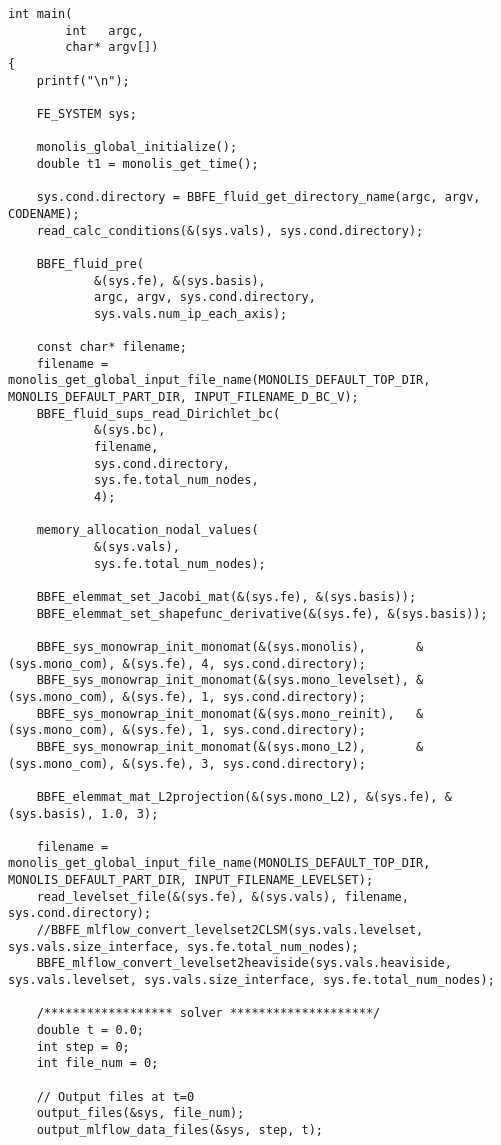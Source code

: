 \begin{lstlisting}[caption = mlflow\_fs.cのmain関数のレベルセット関数の計算部分抜粋]
int main(
		int   argc,
		char* argv[])
{
	printf("\n");

	FE_SYSTEM sys;

	monolis_global_initialize();
	double t1 = monolis_get_time();

	sys.cond.directory = BBFE_fluid_get_directory_name(argc, argv, CODENAME);	
	read_calc_conditions(&(sys.vals), sys.cond.directory);

	BBFE_fluid_pre(
			&(sys.fe), &(sys.basis),
			argc, argv, sys.cond.directory,
			sys.vals.num_ip_each_axis);

	const char* filename;
	filename = monolis_get_global_input_file_name(MONOLIS_DEFAULT_TOP_DIR, MONOLIS_DEFAULT_PART_DIR, INPUT_FILENAME_D_BC_V);
	BBFE_fluid_sups_read_Dirichlet_bc(
			&(sys.bc),
			filename,
			sys.cond.directory,
			sys.fe.total_num_nodes,
			4);

	memory_allocation_nodal_values(
			&(sys.vals),
			sys.fe.total_num_nodes);
	
	BBFE_elemmat_set_Jacobi_mat(&(sys.fe), &(sys.basis));
	BBFE_elemmat_set_shapefunc_derivative(&(sys.fe), &(sys.basis));
	
	BBFE_sys_monowrap_init_monomat(&(sys.monolis),       &(sys.mono_com), &(sys.fe), 4, sys.cond.directory);
	BBFE_sys_monowrap_init_monomat(&(sys.mono_levelset), &(sys.mono_com), &(sys.fe), 1, sys.cond.directory);
	BBFE_sys_monowrap_init_monomat(&(sys.mono_reinit),   &(sys.mono_com), &(sys.fe), 1, sys.cond.directory);
	BBFE_sys_monowrap_init_monomat(&(sys.mono_L2),       &(sys.mono_com), &(sys.fe), 3, sys.cond.directory);

	BBFE_elemmat_mat_L2projection(&(sys.mono_L2), &(sys.fe), &(sys.basis), 1.0, 3);

	filename = monolis_get_global_input_file_name(MONOLIS_DEFAULT_TOP_DIR, MONOLIS_DEFAULT_PART_DIR, INPUT_FILENAME_LEVELSET);
	read_levelset_file(&(sys.fe), &(sys.vals), filename, sys.cond.directory);
	//BBFE_mlflow_convert_levelset2CLSM(sys.vals.levelset, sys.vals.size_interface, sys.fe.total_num_nodes);
	BBFE_mlflow_convert_levelset2heaviside(sys.vals.heaviside, sys.vals.levelset, sys.vals.size_interface, sys.fe.total_num_nodes);

	/****************** solver ********************/
	double t = 0.0;
	int step = 0;
	int file_num = 0;

	// Output files at t=0
	output_files(&sys, file_num);
	output_mlflow_data_files(&sys, step, t);


\end{lstlisting}
